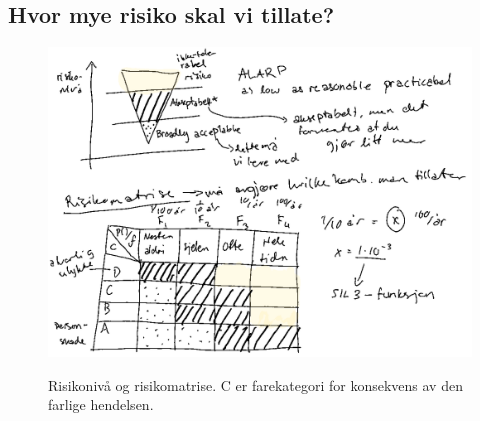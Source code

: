 \subsection{Hvor mye risiko skal vi tillate?}

\begin{figure}[H]
    \centering
        \includegraphics[width=\textwidth]{figures/IEC/risikomatrise.png}\\
        \caption{Risikonivå og risikomatrise. C er farekategori for konsekvens av den farlige hendelsen.}
\end{figure}
